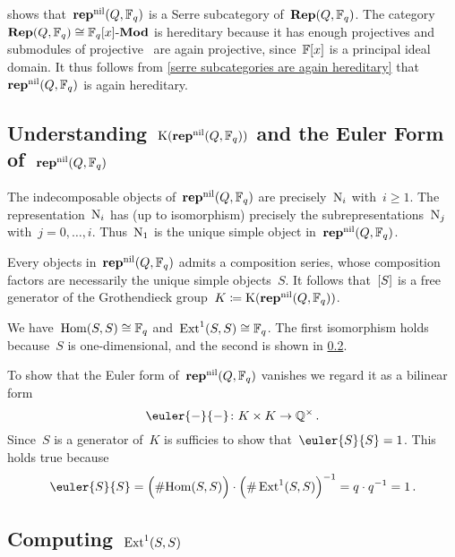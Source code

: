 \documentclass[a4paper,11pt]{scrartcl}
\begin{document}
\begin{example}
   shows that~$\mathbf{rep}^{\mathrm{nil}}(Q, \mathbb{F}_q)$ is a Serre subcategory of~$\mathbf{Rep}(Q, \mathbb{F}_q)$.
  The category~$\mathbf{Rep}(Q, \mathbb{F}_q) \cong \mathbb{F}_q[x]\textrm{-}\mathbf{Mod}$ is hereditary because it has enough projectives and submodules of projective~ are again projective, since~$\mathbb{F}[x]$ is a principal ideal domain.
  It thus follows from \cref{serre subcategories are again hereditary} that~$\mathbf{rep}^{\mathrm{nil}}(Q, \mathbb{F}_q)$ is again hereditary.
\end{example}



\subsection{Understanding~$\operatorname{K}(\mathbf{rep}^{\mathrm{nil}}(Q, \mathbb{F}_q))$ and the Euler Form of~$\mathbf{rep}^{\mathrm{nil}}(Q, \mathbb{F}_q)$}
\label{proof of controlling ext}

The indecomposable objects of~$\mathbf{rep}^{\mathrm{nil}}(Q, \mathbb{F}_q)$ are precisely~$\mathrm{N}_i$ with~$i \geq 1$.
The representation~$\mathrm{N}_i$ has (up to isomorphism) precisely the subrepresentations~$\mathrm{N}_j$ with~$j = 0, \dotsc, i$.
Thus~$\mathrm{N}_1$ is the unique simple object in~$\mathbf{rep}^{\mathrm{nil}}(Q, \mathbb{F}_q)$.

Every objects in~$\mathbf{rep}^{\mathrm{nil}}(Q, \mathbb{F}_q)$ admits a composition series, whose composition factors are necessarily the unique simple objects~$S$.
It follows that~$[S]$ is a free generator of the Grothendieck group~$K \coloneqq \operatorname{K}(\mathbf{rep}^{\mathrm{nil}}(Q, \mathbb{F}_q))$.

We have~$\operatorname{Hom}(S, S) \cong \mathbb{F}_q$ and~$\operatorname{Ext}^1(S,S) \cong \mathbb{F}_q$.
The first isomorphism holds because~$S$ is one-dimensional, and the second is shown in \cref{computing ext}.

To show that the Euler form of~$\mathbf{rep}^{\mathrm{nil}}(Q, \mathbb{F}_q)$ vanishes we regard it as a bilinear form
\[
  \euler{-}{-}
  \colon
  K \times K
  \to
  \Rational^\times \,.
\]
Since~$S$ is a generator of~$K$ is sufficies to show that~$\euler{S}{S} = 1$.
This holds true because
\[
  \euler{S}{S}
  =
  \Bigl( \counting {\Hom(S,S)} \Bigr)
  \cdot
  \Bigl( \counting \Ext^1(S,S) \Bigr)^{-1}
  =
  q \cdot q^{-1}
  =
  1 \,.
\]



\subsection{Computing~$\operatorname{Ext}^1(S,S)$}
\label{computing ext}
\end{document}
